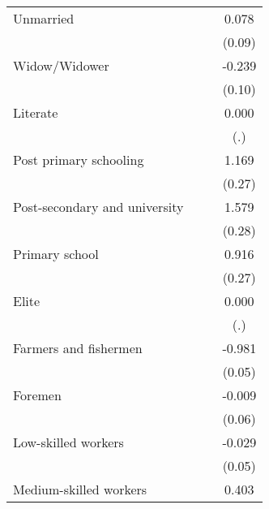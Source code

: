 {\begin{tabular}{l*{3}{c}}
Unmarried           &                     &                     &       0.078         \\
                    &                     &                     &      (0.09)         \\
Widow/Widower       &                     &                     &      -0.239\sym{*}  \\
                    &                     &                     &      (0.10)         \\
Literate            &                     &                     &       0.000         \\
                    &                     &                     &         (.)         \\
Post primary schooling&                     &                     &       1.169\sym{***}\\
                    &                     &                     &      (0.27)         \\
Post-secondary and university&                     &                     &       1.579\sym{***}\\
                    &                     &                     &      (0.28)         \\
Primary school      &                     &                     &       0.916\sym{***}\\
                    &                     &                     &      (0.27)         \\
Elite               &                     &                     &       0.000         \\
                    &                     &                     &         (.)         \\
Farmers and fishermen&                     &                     &      -0.981\sym{***}\\
                    &                     &                     &      (0.05)         \\
Foremen             &                     &                     &      -0.009         \\
                    &                     &                     &      (0.06)         \\
Low-skilled workers &                     &                     &      -0.029         \\
                    &                     &                     &      (0.05)         \\
Medium-skilled workers&                     &                     &       0.403\sym{***}\\

\end{tabular}}
